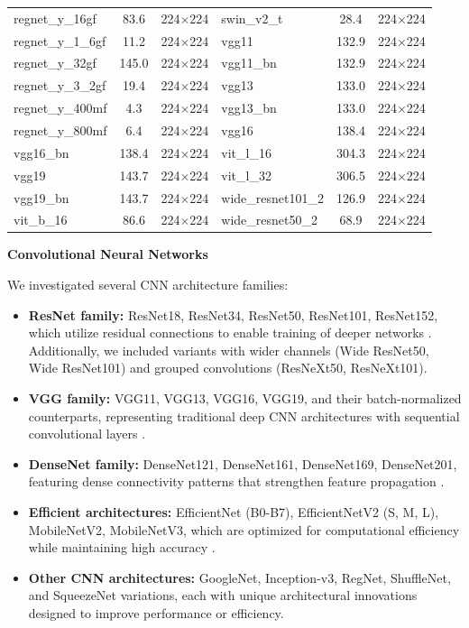 \documentclass[12pt,a4paper,oneside]{report}
\begin{document}
\begin{table}[htbp]
{\begin{tabular}{lcc|lcc}
regnet\_y\_16gf & 83.6 & 224$\times$224 & swin\_v2\_t & 28.4 & 224$\times$224 \\
regnet\_y\_1\_6gf & 11.2 & 224$\times$224 & vgg11 & 132.9 & 224$\times$224 \\
regnet\_y\_32gf & 145.0 & 224$\times$224 & vgg11\_bn & 132.9 & 224$\times$224 \\
regnet\_y\_3\_2gf & 19.4 & 224$\times$224 & vgg13 & 133.0 & 224$\times$224 \\
regnet\_y\_400mf & 4.3 & 224$\times$224 & vgg13\_bn & 133.0 & 224$\times$224 \\
regnet\_y\_800mf & 6.4 & 224$\times$224 & vgg16 & 138.4 & 224$\times$224 \\
vgg16\_bn & 138.4 & 224$\times$224 & vit\_l\_16 & 304.3 & 224$\times$224 \\
vgg19 & 143.7 & 224$\times$224 & vit\_l\_32 & 306.5 & 224$\times$224 \\
vgg19\_bn & 143.7 & 224$\times$224 & wide\_resnet101\_2 & 126.9 & 224$\times$224 \\
vit\_b\_16 & 86.6 & 224$\times$224 & wide\_resnet50\_2 & 68.9 & 224$\times$224 \\
\bottomrule
\end{tabular}%
}
\end{table}

\textbf{Convolutional Neural Networks}

We investigated several CNN architecture families:

\begin{itemize}
    \item \textbf{ResNet family:} ResNet18, ResNet34, ResNet50, ResNet101, ResNet152, which utilize residual connections to enable training of deeper networks \cite{heDeepResidualLearning2015}. Additionally, we included variants with wider channels (Wide ResNet50, Wide ResNet101) and grouped convolutions (ResNeXt50, ResNeXt101).
    
    \item \textbf{VGG family:} VGG11, VGG13, VGG16, VGG19, and their batch-normalized counterparts, representing traditional deep CNN architectures with sequential convolutional layers \cite{simonyanVeryDeepConvolutional2015}.
    
    \item \textbf{DenseNet family:} DenseNet121, DenseNet161, DenseNet169, DenseNet201, featuring dense connectivity patterns that strengthen feature propagation \cite{huangDenselyConnectedConvolutional2017}.
    
    \item \textbf{Efficient architectures:} EfficientNet (B0-B7), EfficientNetV2 (S, M, L), MobileNetV2, MobileNetV3, which are optimized for computational efficiency while maintaining high accuracy \cite{tanEfficientNetRethinkingModel2020}.
    
    \item \textbf{Other CNN architectures:} GoogleNet, Inception-v3, RegNet, ShuffleNet, and SqueezeNet variations, each with unique architectural innovations designed to improve performance or efficiency.
\end{itemize}
\end{document}
